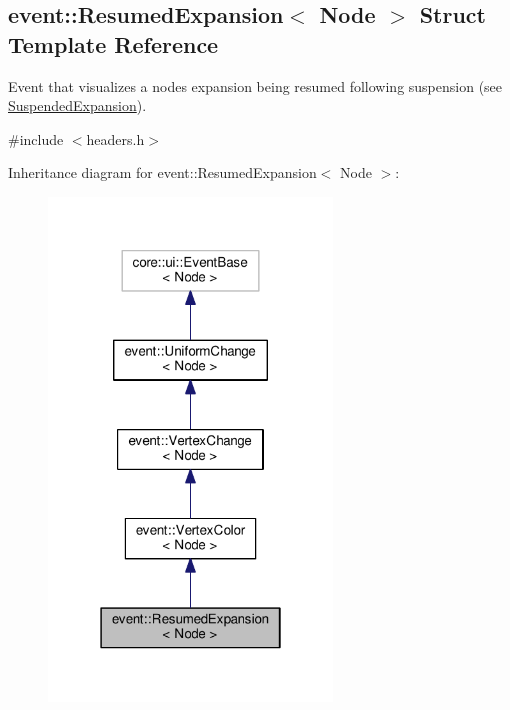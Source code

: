 \hypertarget{structevent_1_1ResumedExpansion}{}\subsection{event\+:\+:Resumed\+Expansion$<$ Node $>$ Struct Template Reference}
\label{structevent_1_1ResumedExpansion}


Event that visualizes a node\textquotesingle{}s expansion being resumed following suspension (see \hyperlink{structSuspendedExpansion}{Suspended\+Expansion}).  




{\ttfamily \#include $<$headers.\+h$>$}



Inheritance diagram for event\+:\+:Resumed\+Expansion$<$ Node $>$\+:\nopagebreak
\begin{figure}[H]
\begin{center}
\leavevmode
\includegraphics[width=214pt]{structevent_1_1ResumedExpansion__inherit__graph}
\end{center}
\end{figure}


